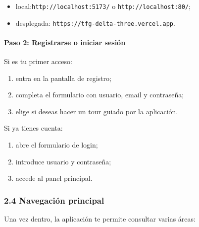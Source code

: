 \begin{itemize}
    \item local:\texttt{http://localhost:5173/} o \texttt{http://localhost:80/};
    \item desplegada: \texttt{https://tfg-delta-three.vercel.app}.
\end{itemize}

\paragraph*{Paso 2: Registrarse o iniciar sesión}

Si es tu primer acceso:

\begin{enumerate}
    \item entra en la pantalla de registro;
    \item completa el formulario con usuario, email y contraseña;
    \item elige si deseas hacer un tour guiado por la aplicación.
\end{enumerate}

Si ya tienes cuenta:

\begin{enumerate}
    \item abre el formulario de login;
    \item introduce usuario y contraseña;
    \item accede al panel principal.
\end{enumerate}

\subsubsection*{2.4 Navegación principal}

Una vez dentro, la aplicación te permite consultar varias áreas:

